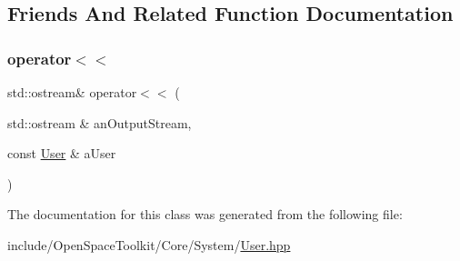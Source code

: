 \subsection{Friends And Related Function Documentation}
\mbox{\label{classostk_1_1core_1_1system_1_1_user_ac434498b36c6e29a86acbb50589e91a3}} 
\subsubsection{\texorpdfstring{operator$<$$<$}{operator<<}}
{\footnotesize\ttfamily std\+::ostream\& operator$<$$<$ (\begin{DoxyParamCaption}\item[{std\+::ostream \&}]{an\+Output\+Stream,  }\item[{const \hyperlink{classostk_1_1core_1_1system_1_1_user}{User} \&}]{a\+User }\end{DoxyParamCaption})\hspace{0.3cm}{\ttfamily [friend]}}



The documentation for this class was generated from the following file\+:\begin{DoxyCompactItemize}
\item 
include/\+Open\+Space\+Toolkit/\+Core/\+System/\hyperlink{_user_8hpp}{User.\+hpp}\end{DoxyCompactItemize}

